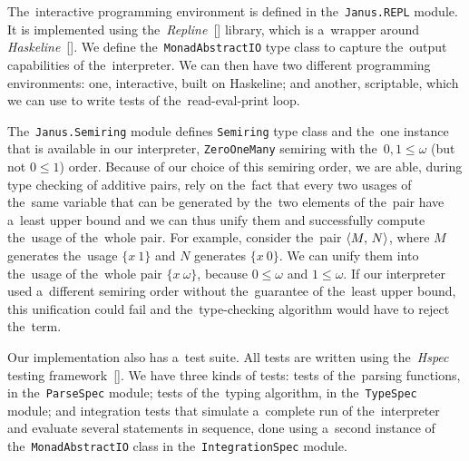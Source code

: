 The~interactive programming environment is defined in the~\texttt{Janus.REPL}
module. It is implemented using
the~\emph{Repline}~[\citeauthor{repline}] library, which is a~wrapper around
\emph{Haskeline}~[\citeauthor{haskeline}]. We define
the~\texttt{MonadAbstractIO} type class to capture the~output capabilities of
the~interpreter. We can then have two different programming environments: one,
interactive, built on Haskeline; and another, scriptable, which we can use to
write tests of the~read-eval-print loop.

The~\texttt{Janus.Semiring} module defines \texttt{Semiring} type class and
the~one instance that is available in our interpreter, \texttt{ZeroOneMany}
semiring with the~$0, 1 \leq \omega$ (but not $0 \leq 1$) order. Because of our
choice of this semiring order, we are able, during type checking of additive
pairs, rely on the~fact that every two usages of the~same variable that can be
generated by the~two elements of the~pair have a~least upper bound and we can
thus unify them and successfully compute the~usage of the~whole pair. For
example, consider the~pair $\langle M, \, N\rangle$, where $M$ generates the~usage
$\{x \: 1\}$ and $N$ generates $\{x \: 0\}$. We can unify them into the~usage of
the~whole pair $\{x \: \omega\}$, because $0 \leq \omega$ and $1 \leq \omega$.
If our interpreter used a~different semiring order without the~guarantee of
the~least upper bound, this unification could fail and the~type-checking
algorithm would have to reject the~term.

Our implementation also has a~test suite. All tests are written using
the~\emph{Hspec} testing framework~[\citeauthor{hspec}]. We have three kinds of
tests: tests of the~parsing functions, in the~\texttt{ParseSpec} module; tests
of the~typing algorithm, in the~\texttt{TypeSpec} module; and integration tests
that simulate a~complete run of the~interpreter and evaluate several statements
in sequence, done using a~second instance of the~\texttt{MonadAbstractIO} class
in the~\texttt{IntegrationSpec} module.


